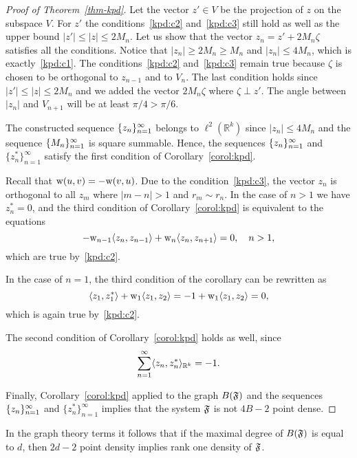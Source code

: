 \documentclass[12pt,oneside,a4paper]{amsart}
\begin{document}
\begin{proof}[Proof of Theorem~\ref{thm-kpd}]
        Let the vector $z' \in V$ be the projection of $z$ on the subspace $V$.
        For $z'$ the conditions~\ref{kpd:c2} and~\ref{kpd:c3} still hold as well as the upper bound
          $\lvert z'\rvert \leq \lvert z\rvert \leq 2 M_n$.
        Let us show that the vector $z_n = z' + 2 M_n \zeta$ satisfies all the conditions.
        Notice that $\lvert z_n \rvert \geq 2 M_n \geq M_n$ and $\lvert z_n \rvert \leq 4 M_n$,
          which is exactly~\ref{kpd:c1}.
        The conditions~\ref{kpd:c2} and~\ref{kpd:c3} remain true because $\zeta$ is chosen to be orthogonal to $z_{n - 1}$ and to $V_n$.
        The last condition holds since $\lvert z'\rvert \leq \lvert z \rvert \leq 2 M_n$ and we added the vector $2M_n \zeta$
          where $\zeta \perp z'$.
        The angle between $\lvert z_n\rvert$ and $V_{n+1}$ will be at least $\pi / 4 > \pi / 6$.
        \smallskip

        The constructed sequence $\{{z}_n\}_{n=1}^\infty$ belongs to $\ell^2({\mathbb{R}^k})$
          since $\lvert z_n \rvert \leq 4M_n$ and the sequence $\{{M}_n\}_{n=1}^\infty$ is square summable.
        Hence, the sequences $\{{z}_n\}_{n=1}^\infty$ and $\{z_n^*\}_{n=1}^\infty$ satisfy the first condition of Corollary~\ref{corol:kpd}.

        Recall that $\mathrm{w}(u, v) = -\mathrm{w}(v, u)$.
        Due to the condition~\ref{kpd:c3}, the vector $z_n$ is orthogonal to all
          $z_m$ where $\lvert m - n \rvert > 1$ and $r_m \sim r_n$.
        In the case of $n > 1$ we have $z_n^* = 0$, and the third condition of Corollary~\ref{corol:kpd} is equivalent to the equations
        \[
          -\mathrm{w}_{n - 1} \langle z_n, z_{n-1} \rangle + \mathrm{w}_n \langle z_n, z_{n+1} \rangle = 0, \quad n > 1,
        \]
        which are true by~\ref{kpd:c2}.

        In the case of $n = 1$, the third condition of the corollary can be rewritten as
        \[
        \langle z_1, z_1^* \rangle + \mathrm{w}_1 \langle z_1, z_2 \rangle = -1 + \mathrm{w}_1 \langle z_1, z_2 \rangle = 0,
        \]
        which is again true by~\ref{kpd:c2}.

        The second condition of Corollary~\ref{corol:kpd} holds as well, since 
        \[ 
          \sum_{n=1}^\infty \langle z_n, z^*_n \rangle_{\mathbb{R}^k} = -1.
        \]

        Finally, Corollary~\ref{corol:kpd} applied to the graph $B(\mathfrak{F})$ and the sequences $\{{z}_n\}_{n=1}^\infty$ and $\{z_n^*\}_{n=1}^\infty$ implies that the system $\mathfrak{F}$ is not $4B - 2$ point dense.
      \end{proof}
      \begin{remark*}
        In the graph theory terms it follows that if the maximal degree of $B(\mathfrak{F})$ is equal to $d$,
          then $2d - 2$ point density implies rank one density of $\mathfrak{F}$.
      \end{remark*}
  \bigskip
\end{document}
